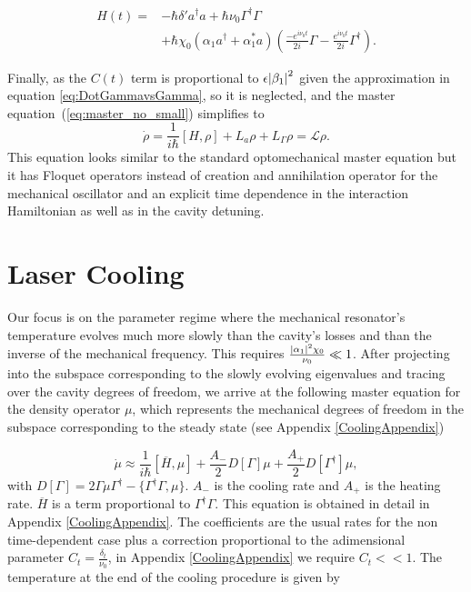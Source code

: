 \documentclass[reprint, amsmath,amssymb, aps,pra]{revtex4-1}
\begin{document}
\begin{align} \label{LCHamiltonian}
H(t) =& -\hbar \delta' a^{\dagger}a +\hbar\nu_0\Gamma^{\dagger}\Gamma \\
&+\hbar \chi_0(\alpha_1 a^{\dagger}+\alpha^*_1 a)(\frac{-e^{i\nu_0 t}}{2i}\Gamma-\frac{
e^{i\nu_0 t}}{2i} \nonumber\Gamma^{\dagger}).
\end{align} 

Finally, as the $C(t)$ term is proportional to $\epsilon\abs{\beta_1}^2$ given the approximation in equation \eqref{eq:DotGammavsGamma}, so it is neglected, and the master
equation~(\ref{eq:master_no_small}) simplifies to
\begin{equation}\label{LCMasterEq}
\dot{\rho} = \frac{1}{i\hbar}[H,\rho] +L_a\rho + L_\Gamma \rho = \mathcal{L}\rho.
\end{equation}
This equation looks similar to the standard optomechanical master
equation but it has Floquet operators instead of creation and
annihilation operator for the mechanical oscillator and an explicit
time dependence in the interaction Hamiltonian as well as in the cavity detuning.


\section{Laser Cooling}\label{LasCool}

Our focus is on the parameter regime where the mechanical resonator's
temperature evolves much more slowly than the cavity's losses and than
the inverse of the mechanical frequency. This requires
$\frac{\abs{\alpha_1}^2\chi_0}{\nu_0}\ll 1$.
After projecting into the subspace corresponding to the slowly
evolving eigenvalues and tracing over the cavity degrees of
freedom, we arrive at the following master equation for the density
operator $\mu$, which represents the mechanical degrees of freedom in the subspace corresponding to the steady state (see Appendix \ref{CoolingAppendix})

\begin{equation}\label{eq:ProyectedMasterEqCooling}
\dot{\mu} \approx \frac{1}{i\hbar}[\overline{H},\mu] + \frac{A_-}{2}D[\Gamma]\mu + \frac{A_+}{2}D[\Gamma^\dagger]\mu, 
\end{equation} with $D[\Gamma] = 2\Gamma \mu \Gamma^\dagger -\{\Gamma^\dagger \Gamma, \mu\}$. $A_-$ is the cooling rate and $A_+$ is the heating rate. $\overline{H}$ is a term proportional to $\Gamma^\dagger \Gamma$. This equation is obtained in detail in Appendix \ref{CoolingAppendix}. The coefficients are the usual rates for the non time-dependent case plus a correction proportional to the adimensional parameter $C_t=\frac{\delta_t}{\nu_0}$, in Appendix \ref{CoolingAppendix} we require $C_t << 1$. The temperature at the end of the cooling procedure is  given by 
\end{document}
